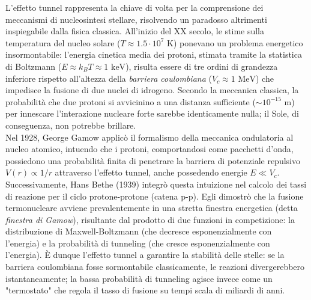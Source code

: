\documentclass[a4paper,11pt]{report}
\begin{document}
\begin{approfondimento}[colback= white, colframe=green!35!black, no shadow, title={Applicazione astrofisica: il modello di Gamow-Bethe}]
L'effetto tunnel rappresenta la chiave di volta per la comprensione dei meccanismi di nucleosintesi stellare, risolvendo un paradosso altrimenti inspiegabile dalla fisica classica.
All'inizio del XX secolo, le stime sulla temperatura del nucleo solare ($T \approx 1.5 \cdot 10^7$ K) ponevano un problema energetico insormontabile: l'energia cinetica media dei protoni, stimata tramite la statistica di Boltzmann ($E \approx k_B T \approx 1 \text{ keV}$), risulta essere di tre ordini di grandezza inferiore rispetto all'altezza della \textit{barriera coulombiana} ($V_c \approx 1 \text{ MeV}$) che impedisce la fusione di due nuclei di idrogeno.
Secondo la meccanica classica, la probabilità che due protoni si avvicinino a una distanza sufficiente ($\sim 10^{-15}$ m) per innescare l'interazione nucleare forte sarebbe identicamente nulla; il Sole, di conseguenza, non potrebbe brillare. \\

\noindent
Nel 1928, George Gamow applicò il formalismo della meccanica ondulatoria al nucleo atomico, intuendo che i protoni, comportandosi come pacchetti d'onda, possiedono una probabilità finita di penetrare la barriera di potenziale repulsivo $V(r) \propto 1/r$ attraverso l'effetto tunnel, anche possedendo energie $E \ll V_c$.
Successivamente, Hans Bethe (1939) integrò questa intuizione nel calcolo dei tassi di reazione per il ciclo protone-protone (catena p-p). Egli dimostrò che la fusione termonucleare avviene prevalentemente in una stretta finestra energetica (detta \textit{finestra di Gamow}), risultante dal prodotto di due funzioni in competizione: la distribuzione di Maxwell-Boltzmann (che decresce esponenzialmente con l'energia) e la probabilità di tunneling (che cresce esponenzialmente con l'energia).
È dunque l'effetto tunnel a garantire la stabilità delle stelle: se la barriera coulombiana fosse sormontabile classicamente, le reazioni divergerebbero istantaneamente; la bassa probabilità di tunneling agisce invece come un "termostato" che regola il tasso di fusione su tempi scala di miliardi di anni.



\end{approfondimento}
\end{document}
